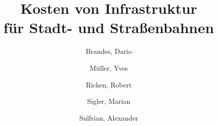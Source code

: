 \documentclass[oneside,a4paper,11pt,german]{article}
\title{Kosten von Infrastruktur \\ für Stadt- und Straßenbahnen}
\author{
  Brandes, Dario \and
  Müller, Yves \and
  Ricken, Robert \and
  Sigler, Marian \and
  Sulfrian, Alexander
}
\begin{document}
\maketitle

\begin{comment}
Gliederung:

* Einleitung


* Theorie / Grundlagen
  * Definitionen: Kein EBO, Trennung U-Bahn/Straßenbahn (Tunnel vs. nein)
  * Methode
     * wie wurden die Zahlen versucht zu ermitteln
     * welche Kennwerte wurden wie berechnet (kosten/strecken km)
     * warum sind die Kennwerte sinvoll

* Ergebnisse
  * Vorstellung der Projekte
    * Beschreibung der Strecke
    * momentaner Baustand / Plannungsstand
  * Tabelle allen Ergbnissen

* Auswertung
  * Ermittlung von Höchsts- /  Durchschnittswerten Inland getrennt U-Bahnen/Straßenbahnen
    * tabellarisch
    * mit Hilfe von Diagrammen
  * Vergleich mit den Werten im Ausland
  * Fehleranalyse (welche Außreißer existieren warum)

* Zusammenfassung



\end{comment}













\end{document}
